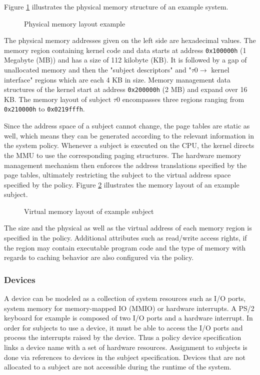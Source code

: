Figure \ref{fig:phys-mem-layout-example} illustrates the physical memory
structure of an example system.

\begin{figure}[h]
	\centering
	
	\caption{Physical memory layout example}
	\label{fig:phys-mem-layout-example}
\end{figure}

The physical memory addresses given on the left side are hexadecimal values.
The memory region containing kernel code and data starts at address
\texttt{0x100000h} (1 Megabyte (MB)) and has a size of 112 kilobyte (KB). It is
followed by a gap of unallocated memory and then the "subject descriptors" and
"$\tau0\rightarrow$ kernel interface" regions which are each 4 KB in size.
Memory management data structures of the kernel start at address
\texttt{0x200000h} (2 MB) and expand over 16 KB. The memory layout of subject
$\tau0$ encompasses three regions ranging from \texttt{0x210000h} to
\texttt{0x0219fffh}.

Since the address space of a subject cannot change, the page tables are static
as well, which means they can be generated according to the relevant information
in the system policy. Whenever a subject is executed on the CPU, the kernel
directs the MMU to use the corresponding paging structures. The hardware memory
management mechanism then enforces the address translations specified by the
page tables, ultimately restricting the subject to the virtual address space
specified by the policy. Figure \ref{fig:virt-mem-layout-example} illustrates
the memory layout of an example subject.

\begin{figure}[h]
	\centering
	
	\caption{Virtual memory layout of example subject}
	\label{fig:virt-mem-layout-example}
\end{figure}

The size and the physical as well as the virtual address of each memory region
is specified in the policy. Additional attributes such as read/write access
rights, if the region may contain executable program code and the type of memory
with regards to caching behavior are also configured via the policy.

\subsubsection{Devices}
A device can be modeled as a collection of system resources such as I/O ports,
system memory for memory-mapped IO (MMIO) or hardware interrupts. A PS/2
keyboard for example is composed of two I/O ports and a hardware interrupt.
In order for subjects to use a device, it must be able to access the I/O ports
and process the interrupts raised by the device. Thus a policy device
specification links a device name with a set of hardware resources. Assignment
to subjects is done via references to devices in the subject specification.
Devices that are not allocated to a subject are not accessible during the
runtime of the system.

